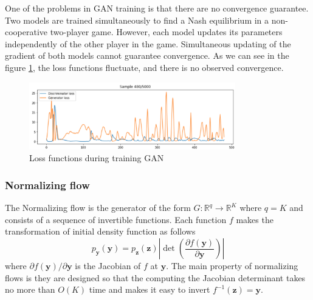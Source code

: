 \documentclass[12pt,a4paper]{article}
\begin{document}
One of the problems in GAN training is that there are no convergence guarantee. Two models are trained simultaneously to find a Nash equilibrium in a non-cooperative two-player game. However, each model updates its parameters independently of the other player in the game. Simultaneous updating of the gradient of both models cannot guarantee convergence. As we can see in the figure \ref{fig:gan}, the loss functions fluctuate, and there is no observed convergence.

\begin{figure}[h!]
    \centering
    \includegraphics[width=0.8\textwidth]{gan.png}
    \caption{Loss functions during training GAN}
    \label{fig:gan}
\end{figure}

\subsubsection{Normalizing flow}

The Normalizing flow \cite{normflow2021} is the generator of the form $G: \mathbb R^q \to \mathbb R^K$ where $q=K$ and consists of a sequence of invertible functions. Each function $f$ makes the transformation of initial density function as follows
$$p_{\mathbf{y}}(\mathbf{y})=p_{\mathbf{z}}(\mathbf{z})\left|\operatorname{det}\left(\frac{\partial f(\mathbf{y})}{\partial \mathbf{y}}\right)\right|$$
where $\partial f(\mathbf y)/\partial \mathbf y$ is the Jacobian of $f$ at $\mathbf y$. The main property of normalizing flows is they are designed so that the computing the Jacobian determinant takes no more than  $O(K)$ time and makes it easy to invert $f^{-1}(\mathbf z) = \mathbf y$.
\end{document}
